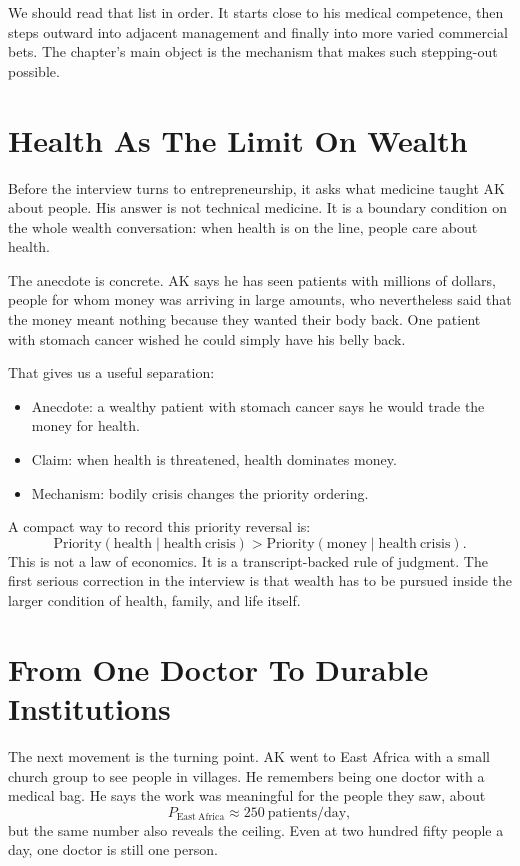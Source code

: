 We should read that list in order. It starts close to his medical competence, then steps outward into adjacent management and finally into more varied commercial bets. The chapter's main object is the mechanism that makes such stepping-out possible.

\section{Health As The Limit On Wealth}

Before the interview turns to entrepreneurship, it asks what medicine taught AK about people. His answer is not technical medicine. It is a boundary condition on the whole wealth conversation: when health is on the line, people care about health.

The anecdote is concrete. AK says he has seen patients with millions of dollars, people for whom money was arriving in large amounts, who nevertheless said that the money meant nothing because they wanted their body back. One patient with stomach cancer wished he could simply have his belly back.

That gives us a useful separation:

\begin{itemize}
\item Anecdote: a wealthy patient with stomach cancer says he would trade the money for health.
\item Claim: when health is threatened, health dominates money.
\item Mechanism: bodily crisis changes the priority ordering.
\end{itemize}

A compact way to record this priority reversal is:
\begin{equation}
\mathrm{Priority}(\mathrm{health}\mid \mathrm{health\ crisis})
>
\mathrm{Priority}(\mathrm{money}\mid \mathrm{health\ crisis}).
\end{equation}
This is not a law of economics. It is a transcript-backed rule of judgment. The first serious correction in the interview is that wealth has to be pursued inside the larger condition of health, family, and life itself.

\section{From One Doctor To Durable Institutions}

The next movement is the turning point. AK went to East Africa with a small church group to see people in villages. He remembers being one doctor with a medical bag. He says the work was meaningful for the people they saw, about
\begin{equation}
P_{\mathrm{East\ Africa}} \approx 250 \ \mathrm{patients/day},
\end{equation}
but the same number also reveals the ceiling. Even at two hundred fifty people a day, one doctor is still one person.

